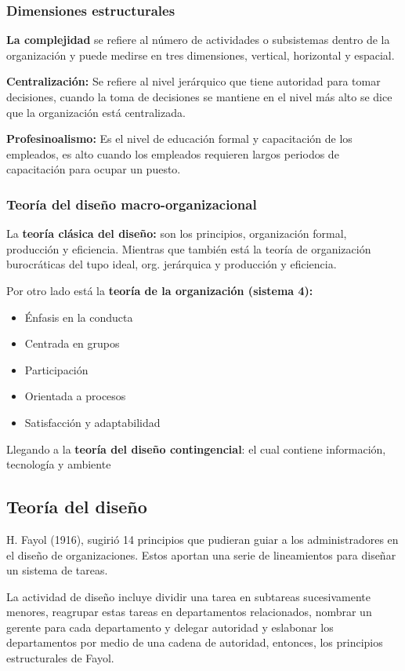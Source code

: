\subsubsection{Dimensiones estructurales}
\textbf{La complejidad} se refiere al número de actividades o subsistemas dentro de la organización y puede medirse en tres dimensiones, vertical, horizontal y espacial.

\textbf{Centralización:} Se refiere al nivel jerárquico que tiene autoridad para tomar decisiones, cuando la toma de decisiones se mantiene en el nivel más alto se dice que la organización está centralizada.

\textbf{Profesinoalismo:} Es el nivel de educación formal  y capacitación de los empleados, es alto cuando los empleados requieren largos periodos de capacitación para ocupar un puesto.

\subsubsection{Teoría del diseño macro-organizacional}
La \textbf{teoría clásica del diseño:} son los principios, organización formal, producción y eficiencia. Mientras que también está la teoría de organización burocráticas del tupo ideal, org. jerárquica y producción y eficiencia.

Por otro lado está la \textbf{teoría de la organización (sistema 4):}
\begin{itemize}
    \item Énfasis en la conducta
    \item Centrada en grupos
    \item Participación
    \item Orientada a procesos
    \item Satisfacción y adaptabilidad
\end{itemize}

Llegando a la \textbf{teoría del diseño contingencial}: el cual contiene información, tecnología y ambiente
\subsection{Teoría del diseño}
H. Fayol (1916), sugirió 14 principios que pudieran guiar a los administradores en el diseño de organizaciones. Estos aportan una serie de lineamientos para diseñar un sistema de tareas.

La actividad de diseño incluye dividir una tarea en subtareas sucesivamente menores, reagrupar estas tareas en departamentos relacionados, nombrar un gerente para cada departamento y delegar autoridad y eslabonar los departamentos por medio de una cadena de autoridad, entonces, los principios estructurales de Fayol.

